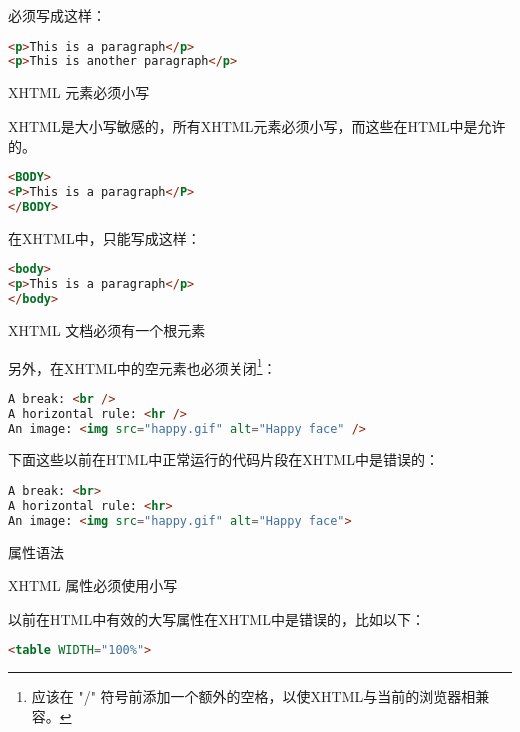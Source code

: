 \begin{compactitem}
\begin{compactitem}
必须写成这样：

\begin{lstlisting}[language=HTML]
<p>This is a paragraph</p>
<p>This is another paragraph</p>
\end{lstlisting}

	\item XHTML 元素必须小写

XHTML是大小写敏感的，所有XHTML元素必须小写，而这些在HTML中是允许的。

\begin{lstlisting}[language=HTML]
<BODY>
<P>This is a paragraph</P>
</BODY>
\end{lstlisting}

在XHTML中，只能写成这样：

\begin{lstlisting}[language=HTML]
<body>
<p>This is a paragraph</p>
</body>
\end{lstlisting}

	\item XHTML 文档必须有一个根元素

	\end{compactitem}





另外，在XHTML中的空元素也必须关闭\footnote{应该在 "/" 符号前添加一个额外的空格，以使XHTML与当前的浏览器相兼容。}：

\begin{lstlisting}[language=HTML]
A break: <br />
A horizontal rule: <hr />
An image: <img src="happy.gif" alt="Happy face" />
\end{lstlisting}

下面这些以前在HTML中正常运行的代码片段在XHTML中是错误的：

\begin{lstlisting}[language=HTML]
A break: <br>
A horizontal rule: <hr>
An image: <img src="happy.gif" alt="Happy face">
\end{lstlisting}



\item 属性语法

	\begin{compactitem}
	\item XHTML 属性必须使用小写

以前在HTML中有效的大写属性在XHTML中是错误的，比如以下：

\begin{lstlisting}[language=HTML]
<table WIDTH="100%">
\end{lstlisting}


\end{compactitem}
\end{compactitem}
